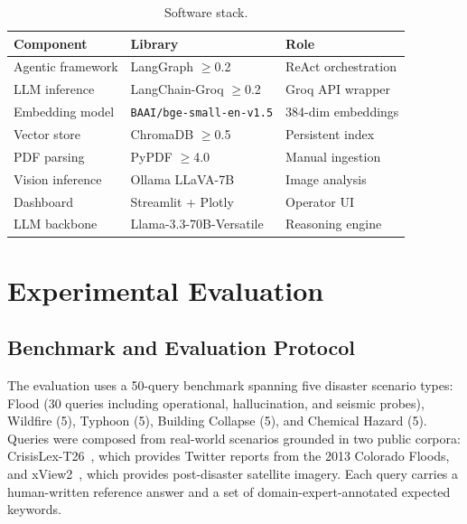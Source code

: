 \documentclass[conference]{IEEEtran}
\begin{document}
\begin{table}[ht]
\centering
\caption{Software stack.}
\label{tab:stack}
\renewcommand{\arraystretch}{1.2}
\setlength{\tabcolsep}{4pt}
\begin{tabular}{@{}lll@{}}
\toprule
\textbf{Component}     & \textbf{Library}                   & \textbf{Role} \\ \midrule
Agentic framework      & LangGraph $\geq$0.2                & ReAct orchestration \\
LLM inference          & LangChain-Groq $\geq$0.2           & Groq API wrapper \\
Embedding model        & \texttt{BAAI/bge-small-en-v1.5}    & 384-dim embeddings \\
Vector store           & ChromaDB $\geq$0.5                 & Persistent index \\
PDF parsing            & PyPDF $\geq$4.0                    & Manual ingestion \\
Vision inference       & Ollama LLaVA-7B                    & Image analysis \\
Dashboard              & Streamlit + Plotly                 & Operator UI \\
LLM backbone           & Llama-3.3-70B-Versatile            & Reasoning engine \\ \bottomrule
\end{tabular}
\end{table}

\section{Experimental Evaluation}

\subsection{Benchmark and Evaluation Protocol}

The evaluation uses a 50-query benchmark spanning five disaster scenario types:
Flood (30 queries including operational, hallucination, and seismic probes),
Wildfire (5), Typhoon (5), Building Collapse (5), and Chemical Hazard (5).
Queries were composed from real-world scenarios grounded in two public corpora:
CrisisLex-T26~\cite{b21}, which provides Twitter reports from the 2013 Colorado
Floods, and xView2~\cite{b22}, which provides post-disaster satellite imagery.
Each query carries a human-written reference answer and a set of
domain-expert-annotated expected keywords.
\end{document}
